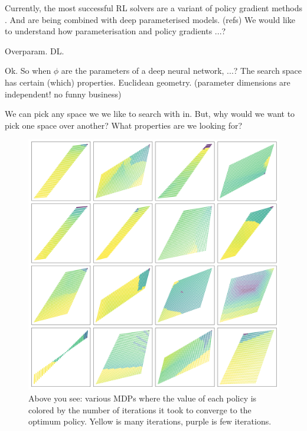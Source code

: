 Currently, the most successful RL solvers are a variant of policy gradient methods \cite{Mnih2016,Schulmanb}.
And are being combined with deep parameterised models. (refs)
We would like to understand how parameterisation and policy gradients ...?


Overparam. DL. \cite{Arora2018}

Ok. So when $\phi$ are the parameters of a deep neural network, ...? The search space has certain (which) properties.
Euclidean geometry.
(parameter dimensions are independent! no funny business)

We can pick any space we we like to search with in. But, why would we want to pick one space over another?
What properties are we looking for?

\begin{figure}[!h]
\centering
\includegraphics[width=1\textwidth,height=1\textheight]{../../pictures/figures/mvi-iterations.png}
\caption{Above you see: various MDPs where the value of each policy is colored
by the number of iterations it took to converge to the optimum policy. Yellow is many iterations, purple is few iterations.}
\end{figure}

